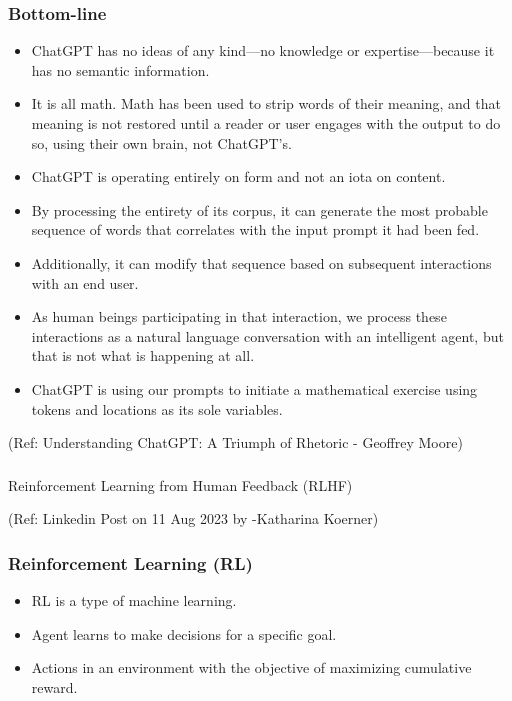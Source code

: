 \begin{frame}[fragile]\frametitle{Bottom-line}

\begin{itemize}
\item ChatGPT has no ideas of any kind—no knowledge or expertise—because it has no semantic information. 
\item It is all math. Math has been used to strip words of their meaning, and that meaning is not restored until a reader or user engages with the output to do so, using their own brain, not ChatGPT’s. 
\item ChatGPT is operating entirely on form and not an iota on content. 
\item By processing the entirety of its corpus, it can generate the most probable sequence of words that correlates with the input prompt it had been fed. 
\item Additionally, it can modify that sequence based on subsequent interactions with an end user. 
\item As human beings participating in that interaction, we process these interactions as a natural language conversation with an intelligent agent, but that is not what is happening at all. 
\item ChatGPT is using our prompts to initiate a mathematical exercise using tokens and locations as its sole variables. 
\end{itemize}


{\tiny (Ref: Understanding ChatGPT: A Triumph of Rhetoric - Geoffrey Moore)}

\end{frame}



\begin{frame}[fragile]\frametitle{}
\begin{center}
{\Large Reinforcement Learning from Human Feedback (RLHF)}

{\tiny (Ref: Linkedin Post on 11 Aug 2023 by -Katharina Koerner)}

\end{center}
\end{frame}

\begin{frame}[fragile]\frametitle{Reinforcement Learning (RL)}
\begin{itemize}
    \item RL is a type of machine learning.
    \item Agent learns to make decisions for a specific goal.
    \item Actions in an environment with the objective of maximizing cumulative reward.
\end{itemize}
\end{frame}

